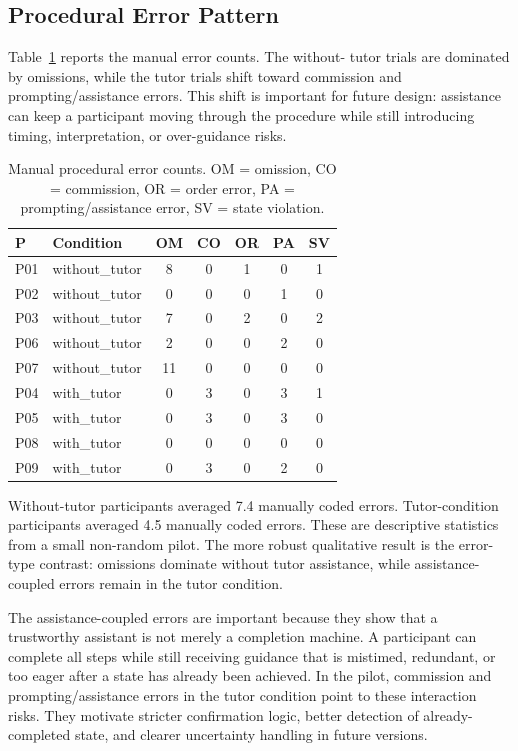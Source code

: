 \subsection{Procedural Error Pattern}

Table~\ref{tab:pilot-errors} reports the manual error counts. The without-
tutor trials are dominated by omissions, while the tutor trials shift toward
commission and prompting/assistance errors. This shift is important for future
design: assistance can keep a participant moving through the procedure while
still introducing timing, interpretation, or over-guidance risks.

\begin{table}[htbp]
\centering
\caption{Manual procedural error counts. OM = omission, CO = commission, OR =
order error, PA = prompting/assistance error, SV = state violation.}
\label{tab:pilot-errors}
\small
\begin{tabular}{@{}llccccc@{}}
\toprule
\textbf{P} & \textbf{Condition} & \textbf{OM} & \textbf{CO} & \textbf{OR} & \textbf{PA} & \textbf{SV} \\
\midrule
P01 & without\_tutor & 8  & 0 & 1 & 0 & 1 \\
P02 & without\_tutor & 0  & 0 & 0 & 1 & 0 \\
P03 & without\_tutor & 7  & 0 & 2 & 0 & 2 \\
P06 & without\_tutor & 2  & 0 & 0 & 2 & 0 \\
P07 & without\_tutor & 11 & 0 & 0 & 0 & 0 \\
\midrule
P04 & with\_tutor & 0  & 3 & 0 & 3 & 1 \\
P05 & with\_tutor & 0  & 3 & 0 & 3 & 0 \\
P08 & with\_tutor & 0  & 0 & 0 & 0 & 0 \\
P09 & with\_tutor & 0  & 3 & 0 & 2 & 0 \\
\bottomrule
\end{tabular}
\end{table}

Without-tutor participants averaged 7.4 manually coded errors. Tutor-condition
participants averaged 4.5 manually coded errors. These are descriptive
statistics from a small non-random pilot. The more robust qualitative result is
the error-type contrast: omissions dominate without tutor assistance, while
assistance-coupled errors remain in the tutor condition.

The assistance-coupled errors are important because they show that a
trustworthy assistant is not merely a completion machine. A participant can
complete all steps while still receiving guidance that is mistimed, redundant,
or too eager after a state has already been achieved. In the pilot, commission
and prompting/assistance errors in the tutor condition point to these
interaction risks. They motivate stricter confirmation logic, better detection
of already-completed state, and clearer uncertainty handling in future
versions.

